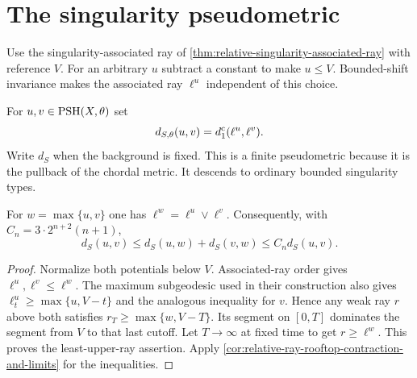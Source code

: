 \section{The singularity pseudometric}
\label{sec:singularity-pseudometric}
Use the singularity-associated ray of \cref{thm:relative-singularity-associated-ray} with reference $V$. For an arbitrary $u$ subtract a constant to make $u\leq V$. Bounded-shift invariance makes the associated ray $\ell^u$ independent of this choice.

\begin{definition}\label{def:singularity-pseudometric}
For $u,v\in\mathrm{PSH}(X,\theta)$ set
\[
 d_{S,\theta}(u,v)=d_1^{\rm c}(\ell^u,\ell^v).
\]
Write $d_S$ when the background is fixed. This is a finite pseudometric because it is the pullback of the chordal metric. It descends to ordinary bounded singularity types.
\end{definition}

\begin{lemma}\label{lem:associated-ray-maximum-identity}
For $w=\max\{u,v\}$ one has $\ell^w=\ell^u\vee\ell^v$. Consequently, with $C_n=3\cdot2^{n+2}(n+1)$,
\[
 d_S(u,v)\leq d_S(u,w)+d_S(v,w)\leq C_n d_S(u,v).
\]
\end{lemma}
\begin{proof}
Normalize both potentials below $V$. Associated-ray order gives $\ell^u,\ell^v\leq\ell^w$. The maximum subgeodesic used in their construction also gives
$\ell_t^u\geq\max\{u,V-t\}$ and the analogous inequality for $v$. Hence any weak ray $r$ above both satisfies $r_T\geq\max\{w,V-T\}$. Its segment on $[0,T]$ dominates the segment from $V$ to that last cutoff. Let $T\to\infty$ at fixed time to get $r\geq\ell^w$. This proves the least-upper-ray assertion. Apply \cref{cor:relative-ray-rooftop-contraction-and-limits} for the inequalities.
\end{proof}

